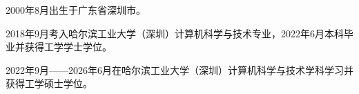 \begin{resume}
2000年8月出生于广东省深圳市。

2018年9月考入哈尔滨工业大学（深圳）计算机科学与技术专业，2022年6月本科毕业并获得工学学士学位。

2022年9月——2026年6月在哈尔滨工业大学（深圳）计算机科学与技术学科学习并获得工学硕士学位。
\end{resume}
